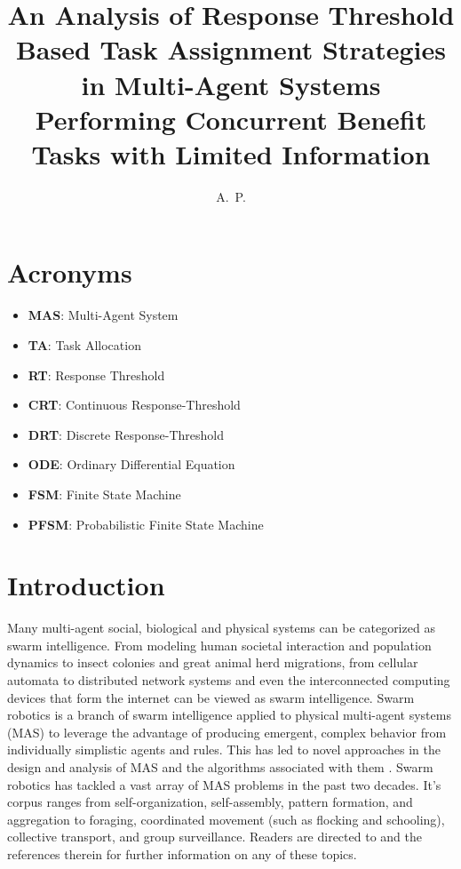 \documentclass[defaultstyle,12pt]{thesis}
\title{An Analysis of Response Threshold Based Task Assignment Strategies in Multi-Agent Systems Performing Concurrent Benefit Tasks with Limited Information}
\author{A.~P.}{Kanakia}
\begin{document}
\chapter*{Acronyms}
\begin{itemize}
	\item \textbf{MAS}:  Multi-Agent System
	\item \textbf{TA}:   Task Allocation
	\item \textbf{RT}:   Response Threshold
	\item \textbf{CRT}:  Continuous Response-Threshold
	\item \textbf{DRT}:  Discrete Response-Threshold
	\item \textbf{ODE}:  Ordinary Differential Equation
	\item \textbf{FSM}:  Finite State Machine
	\item \textbf{PFSM}: Probabilistic Finite State Machine
\end{itemize}

\chapter{Introduction}
Many multi-agent social, biological and physical systems can be categorized as swarm intelligence. From modeling human societal interaction and population dynamics to insect colonies and great animal herd migrations, from cellular automata to distributed network systems and even the interconnected computing devices that form the internet can be viewed as swarm intelligence. Swarm robotics \cite{Sahin2005} is a branch of swarm intelligence applied to physical multi-agent systems (MAS) to leverage the advantage of producing emergent, complex behavior from individually simplistic agents and rules. This has led to novel approaches in the design and analysis of MAS and the algorithms associated with them \cite{Brambilla2013}. Swarm robotics has tackled a vast array of MAS problems in the past two decades. It's corpus ranges from self-organization, self-assembly, pattern formation, and aggregation to foraging, coordinated movement (such as flocking and schooling), collective transport, and group surveillance. Readers are directed to \cite{Bayindir2007} and the references therein for further information on any of these topics. 
\end{document}
